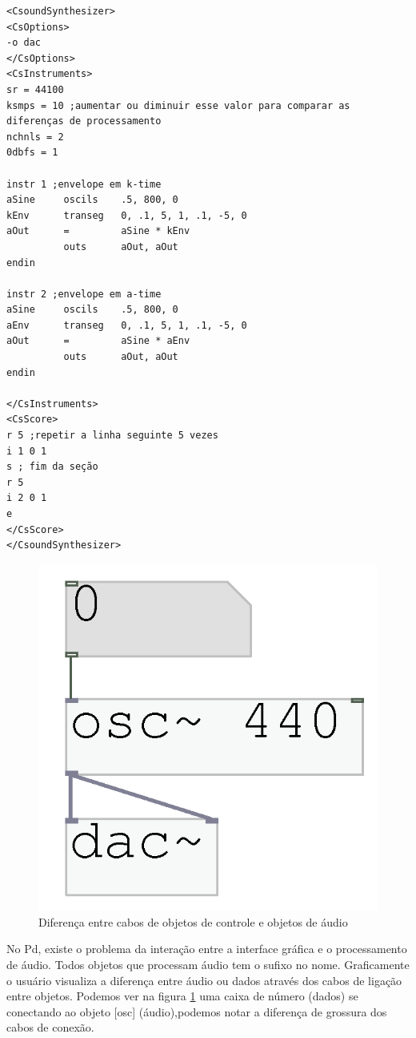 \documentclass{ppgmus}
\begin{document}
\begin{verbatim}
<CsoundSynthesizer>
<CsOptions>
-o dac
</CsOptions>
<CsInstruments>
sr = 44100
ksmps = 10 ;aumentar ou diminuir esse valor para comparar as diferenças de processamento
nchnls = 2
0dbfs = 1

instr 1 ;envelope em k-time
aSine     oscils    .5, 800, 0
kEnv      transeg   0, .1, 5, 1, .1, -5, 0
aOut      =         aSine * kEnv
          outs      aOut, aOut
endin

instr 2 ;envelope em a-time
aSine     oscils    .5, 800, 0
aEnv      transeg   0, .1, 5, 1, .1, -5, 0
aOut      =         aSine * aEnv
          outs      aOut, aOut
endin

</CsInstruments>
<CsScore>
r 5 ;repetir a linha seguinte 5 vezes
i 1 0 1
s ; fim da seção
r 5 
i 2 0 1
e
</CsScore>
</CsoundSynthesizer>
\end{verbatim} 

\begin{figure}
\includegraphics[scale=.6]{cabos}
\caption{Diferença entre cabos de objetos de controle e objetos de áudio}
\label{cabos}
\end{figure}

No Pd, existe o problema da interação entre a interface gráfica e 
o processamento de áudio. Todos objetos que processam áudio tem o sufixo \texttildelow no
nome. Graficamente o usuário visualiza a diferença
entre áudio ou dados através dos cabos de ligação entre objetos. Podemos
ver na figura \ref{cabos} uma caixa de número (dados) se conectando ao objeto [osc\texttildelow]
(áudio),podemos notar a diferença de grossura dos cabos de conexão.
\end{document}
